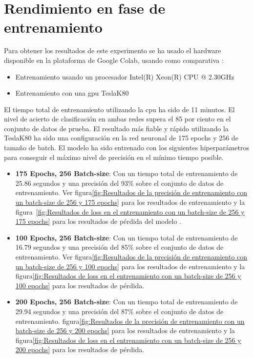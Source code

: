 \section{Rendimiento en fase de entrenamiento}\label{sec:rendimiento-en-fase-de-entrenamiento}
Para obtener los resultados de este experimento se ha usado el hardware disponible en la plataforma de Google Colab, usando como comparativa :
\begin{itemize}
    \item Entrenamiento usando un procesador Intel(R) Xeon(R) CPU @ 2.30GHz
    \item Entrenamiento con una gpu TeslaK80
\end{itemize}

El tiempo total de entrenamiento utilizando la cpu ha sido de 11 minutos.
El nivel de acierto de clasificación en ambas redes supera el 85 por ciento en el conjunto de datos de prueba.
El resultado más fiable y rápido utilizando la TeslaK80 ha sido una configuración en la red neuronal de 175 epochs y 256 de tamaño de batch.
El modelo ha sido entrenado con los siguientes hiperparámetros para conseguir el máximo nivel de precisión en el mínimo tiempo posible.
\begin{itemize}
    \item \textbf{175 Epochs, 256 Batch-size}: Con un tiempo total de entrenamiento de 25.86 segundos y una precisión del 93\% sobre el conjunto de datos de entrenamiento.
    Ver figura\ref{fig:Resultados de la precisión de entrenamiento con un batch-size de 256 y 175 epochs} para los resultados de entrenamiento y la figura~\ref{fig:Resultados de loss en el entrenamiento con un batch-size de 256 y 175 epochs} para los resultados de pérdida del modelo .
    \item \textbf{100 Epochs, 256 Batch-size}: Con un tiempo total de entrenamiento de 16.79 segundos y una precisión del 85\% sobre el conjunto de datos de entrenamiento.
    Ver figura\ref{fig:Resultados de la precisión de entrenamiento con un batch-size de 256 y 100 epochs} para los resultados de entrenamiento y la figura\ref{fig:Resultados de loss en el entrenamiento con un batch-size de 256 y 100 epochs} para los resultados de pérdida.
    \item \textbf{200 Epochs, 256 Batch-size}: Con un tiempo total de entrenamiento de 29.94 segundos y una precisión del 87\% sobre el conjunto de datos de entrenamiento.
    \Ver figura\ref{fig:Resultados de la precisión de entrenamiento con un batch-size de 256 y 200 epochs} para los resultados de entrenamiento y la figura\ref{fig:Resultados de loss en el entrenamiento con un batch-size de 256 y 200 epochs} para los resultados de pérdida.
\end{itemize}

